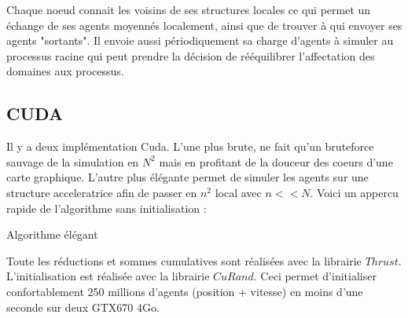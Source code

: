 Chaque noeud connait les voisins de ses structures locales ce qui permet un échange de ses agents moyennés localement, ainsi que de trouver à qui envoyer ses agents "sortants". Il envoie aussi périodiquement sa charge d'agents à simuler au processus racine qui peut prendre la décision de rééquilibrer l'affectation des domaines aux processus.

\subsection{CUDA}

Il y a deux implémentation Cuda. L'une plus brute, ne fait qu'un bruteforce sauvage de la simulation en $N^2$ mais en profitant de la douceur des coeurs d'une carte graphique.
L'autre plus élégante permet de simuler les agents sur une structure acceleratrice afin de passer en $n^2$ local avec $n << N$. Voici un appercu rapide de l'algorithme sans initialisation :

\vskip 0.5cm

\begin{algorithm}[H]

    \caption{Algorithme élégant}
\end{algorithm}

\vskip 1cm
Toute les réductions et sommes cumulatives sont réalisées avec la librairie $Thrust$.
L'initialisation est réalisée avec la librairie $CuRand$. Ceci permet d'initialiser confortablement 250 millions d'agents (position + vitesse) en moins d'une seconde sur deux GTX670 4Go.

